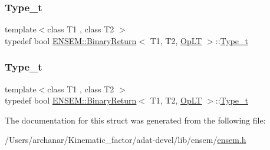 \mbox{\label{structENSEM_1_1BinaryReturn_3_01T1_00_01T2_00_01OpLT_01_4_a5617c2e3cf4124ac0b4d777ae1a195ec}} 
\subsubsection{\texorpdfstring{Type\_t}{Type\_t}\hspace{0.1cm}{\footnotesize\ttfamily [2/3]}}
{\footnotesize\ttfamily template$<$class T1 , class T2 $>$ \\
typedef bool \mbox{\hyperlink{structENSEM_1_1BinaryReturn}{E\+N\+S\+E\+M\+::\+Binary\+Return}}$<$ T1, T2, \mbox{\hyperlink{structENSEM_1_1OpLT}{Op\+LT}} $>$\+::\mbox{\hyperlink{structENSEM_1_1BinaryReturn_3_01T1_00_01T2_00_01OpLT_01_4_a5617c2e3cf4124ac0b4d777ae1a195ec}{Type\+\_\+t}}}

\mbox{\label{structENSEM_1_1BinaryReturn_3_01T1_00_01T2_00_01OpLT_01_4_a5617c2e3cf4124ac0b4d777ae1a195ec}} 
\subsubsection{\texorpdfstring{Type\_t}{Type\_t}\hspace{0.1cm}{\footnotesize\ttfamily [3/3]}}
{\footnotesize\ttfamily template$<$class T1 , class T2 $>$ \\
typedef bool \mbox{\hyperlink{structENSEM_1_1BinaryReturn}{E\+N\+S\+E\+M\+::\+Binary\+Return}}$<$ T1, T2, \mbox{\hyperlink{structENSEM_1_1OpLT}{Op\+LT}} $>$\+::\mbox{\hyperlink{structENSEM_1_1BinaryReturn_3_01T1_00_01T2_00_01OpLT_01_4_a5617c2e3cf4124ac0b4d777ae1a195ec}{Type\+\_\+t}}}



The documentation for this struct was generated from the following file\+:\begin{DoxyCompactItemize}
\item 
/\+Users/archanar/\+Kinematic\+\_\+factor/adat-\/devel/lib/ensem/\mbox{\hyperlink{adat-devel_2lib_2ensem_2ensem_8h}{ensem.\+h}}\end{DoxyCompactItemize}
